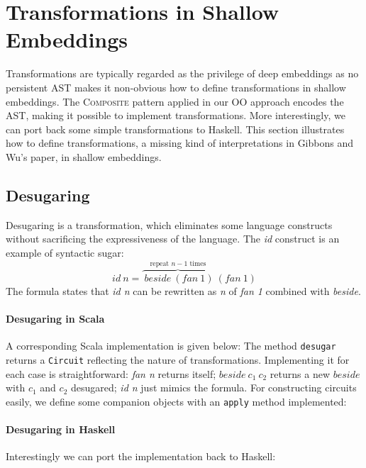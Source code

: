 \section{Transformations in Shallow Embeddings}
Transformations are typically regarded as the privilege of deep embeddings as no
persistent AST makes it non-obvious how to define transformations in shallow embeddings.
The \textsc{Composite} pattern applied in our OO approach encodes the AST, making
it possible to implement transformations. More interestingly, we can port back
some simple transformations to Haskell.
This section illustrates how to define transformations, a missing kind
of interpretations in Gibbons and Wu's paper, in shallow embeddings.

\subsection{Desugaring}
Desugaring is a transformation, which eliminates some
language constructs without sacrificing the expressiveness of the language.
The \emph{id} construct is an example of syntactic sugar:
$$id\ n = \overbrace{\ beside\ (fan\ 1)}^{\text{repeat }n-1\text{ times}}\ (fan\ 1)$$
The formula states that \emph{id n} can be rewritten as \emph{n} of \emph{fan 1}
combined with \emph{beside}.

\paragraph{Desugaring in Scala}
A corresponding Scala implementation is given below:
The method \lstinline{desugar} returns a
\lstinline{Circuit} reflecting the nature of transformations.
Implementing it for each case is
straightforward: \emph{fan n} returns itself; $beside\ c_1\ c_2$ returns a new
$beside$ with $c_1$ and $c_2$ desugared; \emph{id n} just mimics the
formula.
For constructing circuits easily, we define some companion objects with an \lstinline{apply} method implemented:

\paragraph{Desugaring in Haskell}
Interestingly we can port the implementation back to Haskell:

